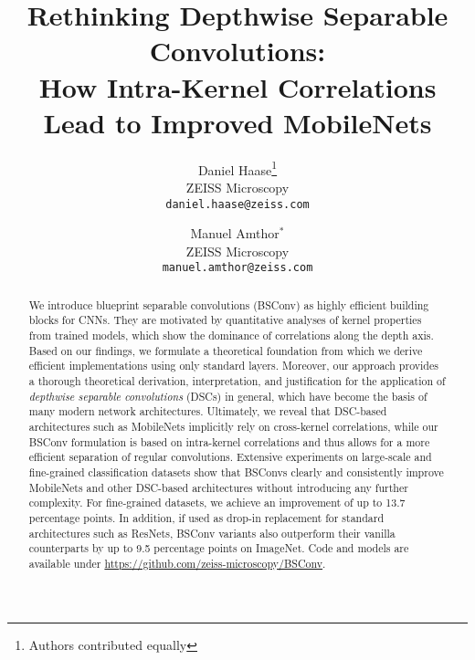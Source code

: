 \documentclass[10pt,twocolumn,letterpaper]{article}
\newcommand{\DCCK}{BSConv\xspace}
\begin{document}
\setlength{\abovedisplayskip}{5pt}
\setlength{\belowdisplayskip}{5pt}
\setlength{\abovedisplayskip}{5pt}
\setlength{\belowdisplayskip}{5pt}



\title{Rethinking Depthwise Separable Convolutions:\\How Intra-Kernel Correlations Lead to Improved MobileNets}

\author{Daniel Haase\thanks{Authors contributed equally}\\
ZEISS Microscopy\\
{\tt\small daniel.haase@zeiss.com}
\and
Manuel Amthor$^*$\\
ZEISS Microscopy\\
{\tt\small manuel.amthor@zeiss.com}
}

\maketitle
\thispagestyle{empty}



\begin{abstract}
We introduce blueprint separable convolutions (\DCCK) as highly efficient building blocks for CNNs.
They are motivated by quantitative analyses of kernel properties from trained models, which show the dominance of correlations along the depth axis.
Based on our findings, we formulate a theoretical foundation from which we derive efficient implementations using only standard layers.
Moreover, our approach provides a thorough theoretical derivation, interpretation, and justification for the application of \textit{depthwise separable convolutions} (DSCs) in general, which have become the basis of many modern network architectures.
Ultimately, we reveal that DSC-based architectures such as MobileNets implicitly rely on cross-kernel correlations, while our \DCCK formulation is based on intra-kernel correlations and thus allows for a more efficient separation of regular convolutions.
Extensive experiments on large-scale and fine-grained classification datasets show that \DCCK{}s clearly and consistently improve MobileNets and other DSC-based architectures without introducing any further complexity.
For fine-grained datasets, we achieve an improvement of up to 13.7 percentage points. 
In addition, if used as drop-in replacement for standard architectures such as ResNets, \DCCK variants also outperform their vanilla counterparts by up to 9.5 percentage points on ImageNet.
Code and models are available under \url{https://github.com/zeiss-microscopy/BSConv}.
\end{abstract}
\vspace{-1.25em}
\end{document}
